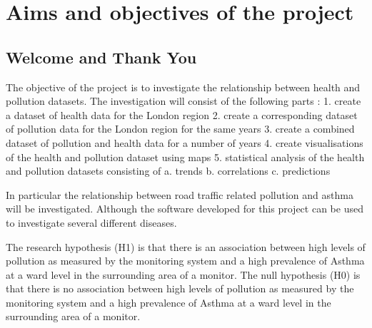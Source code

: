 
\chapter{Aims and objectives of the project} %

\label{Chapter2} %





\section{Welcome and Thank You}
The objective of the project is to investigate the relationship between health and pollution datasets.
The investigation will consist of the following parts :
    1. create a dataset of health data for the London region
    2. create a corresponding dataset of pollution data for the London region for the same years
    3. create a combined dataset of pollution and health data for a number of years
    4. create visualisations of the health and pollution dataset using maps
    5. statistical analysis of the health and pollution datasets consisting of 
        a. trends
        b. correlations
        c. predictions

In particular the relationship between road traffic related pollution and asthma will be investigated. Although the software developed for this project can be used to investigate several different diseases.

The research hypothesis (H1) is that there is an association between high levels of pollution as measured by the monitoring system and a high prevalence of Asthma at a ward level in the surrounding area of a monitor.
 The null hypothesis (H0) is that there is no association between high levels of pollution as measured by the monitoring system and a high prevalence of Asthma at a ward level in the surrounding area of a monitor.


